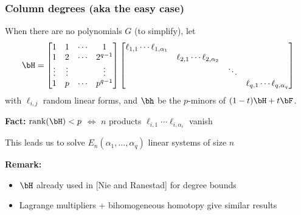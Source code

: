 \documentclass[mathserif,11pt]{beamer}
\def\db#1{\textcolor{_darkblue}{#1}}
\def\rf#1{\db{[{\sf \scriptsize #1}]}}
\def\rk#1{\cdef{{\bf \small #1}}}
\def\cdef#1{\textcolor{_cdef}{#1}}
\def\mF{\bF}
\def\mH{\bH}
\def\rank{\text{rank}}
\begin{document}
\begin{frame}

\frametitle{Column degrees (aka the easy case)}

When there are no polynomials $G$ (to simplify), let 
\[
\mH=\begin{bmatrix}
1 & 1 & \cdots & 1 \\
1 & 2 & \cdots & 2^{q-1} \\
\vdots & \vdots & & \vdots \\
1 & p & \cdots & p^{q-1} 
\end{bmatrix}
\begin{bmatrix}
\ell_{1,1} \cdots \ell_{1,\alpha_1}\\
&\ell_{2,1} \cdots \ell_{2,\alpha_2}\\
&&\ddots\\
&&&\ell_{q,1} \cdots \ell_{q,\alpha_q}
\end{bmatrix}
\]
with $\ell_{i,j}$ random linear forms, and $\bh$ be the $p$-minors 
of $(1-t)\mH + t\mF$.

\medskip

\rk{Fact:} $\rank(\mH) < p$ $\iff$ $n$ products $\ell_{i,1} \cdots \ell_{i,\alpha_i}$ vanish

\medskip

This leads us to solve $E_n(\alpha_1,\dots,\alpha_q)$ linear systems of size $n$

\medskip

\rk{Remark:} 
\begin{itemize}
\item $\mH$ already used in \rf{Nie and Ranestad} for degree bounds
\item Lagrange multipliers + bihomogeneous homotopy give similar results
\end{itemize}

\end{frame}


\end{document}
